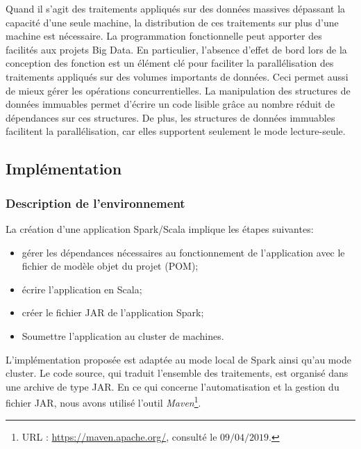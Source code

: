 Quand il s'agit des traitements appliqués sur des données massives dépassant la capacité d'une seule machine, la distribution de ces traitements sur plus d'une machine  est nécessaire. La programmation fonctionnelle peut apporter des facilités aux projets Big Data. 
En particulier, l'absence d'effet de bord lors de la conception des fonction est un élément clé pour faciliter la parallélisation des traitements appliqués sur des volumes importants de données. Ceci permet aussi de mieux gérer les opérations concurrentielles. 
La manipulation des structures de données immuables permet d'écrire un code lisible grâce au nombre réduit de dépendances sur ces structures. De plus, les structures de données immuables facilitent la parallélisation, car elles supportent seulement le mode lecture-seule.




\subsection{Implémentation}
\subsubsection{Description de l'environnement}
La création d'une application Spark/Scala implique  les étapes suivantes:
\begin{itemize}
	\item gérer les dépendances nécessaires au fonctionnement de l'application avec le fichier de modèle objet du projet (POM);
	\item écrire l'application en Scala;
	\item créer le fichier JAR de l'application Spark;
	 \item Soumettre  l'application  au cluster de machines. 
\end{itemize}

L'implémentation proposée est adaptée au mode local de Spark  ainsi qu'au  mode cluster. 
Le code source, qui traduit l'ensemble des traitements, est organisé dans une archive de type JAR.
En ce qui concerne  l'automatisation et la gestion du fichier JAR, nous avons utilisé l'outil \textit{Maven}\footnote{URL : \url{https://maven.apache.org/}, consulté le $09/04/2019$.}.


